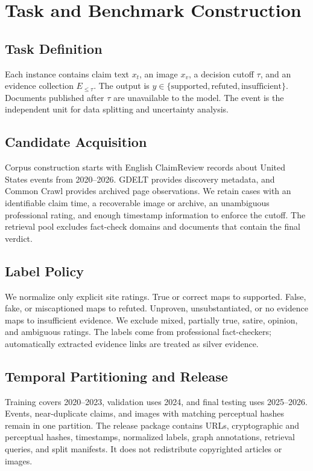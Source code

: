 \section{Task and Benchmark Construction}

\subsection{Task Definition}

Each instance contains claim text $x_t$, an image $x_v$, a decision cutoff $\tau$, and an evidence collection $E_{\leq\tau}$. The output is $y \in \{\text{supported},\text{refuted},\text{insufficient}\}$. Documents published after $\tau$ are unavailable to the model. The event is the independent unit for data splitting and uncertainty analysis.

\subsection{Candidate Acquisition}

Corpus construction starts with English ClaimReview records about United States events from 2020--2026. GDELT provides discovery metadata, and Common Crawl provides archived page observations. We retain cases with an identifiable claim time, a recoverable image or archive, an unambiguous professional rating, and enough timestamp information to enforce the cutoff. The retrieval pool excludes fact-check domains and documents that contain the final verdict.

\subsection{Label Policy}

We normalize only explicit site ratings. True or correct maps to supported. False, fake, or miscaptioned maps to refuted. Unproven, unsubstantiated, or no evidence maps to insufficient evidence. We exclude mixed, partially true, satire, opinion, and ambiguous ratings. The labels come from professional fact-checkers; automatically extracted evidence links are treated as silver evidence.

\subsection{Temporal Partitioning and Release}

Training covers 2020--2023, validation uses 2024, and final testing uses 2025--2026. Events, near-duplicate claims, and images with matching perceptual hashes remain in one partition. The release package contains URLs, cryptographic and perceptual hashes, timestamps, normalized labels, graph annotations, retrieval queries, and split manifests. It does not redistribute copyrighted articles or images.

